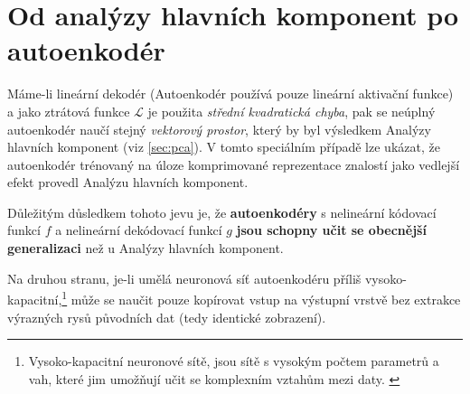 \section{Od analýzy hlavních komponent po autoenkodér}
Máme-li lineární dekodér (Autoenkodér používá pouze lineární aktivační funkce) a jako ztrátová funkce $\mathcal{L}$ je použita \emph{střední kvadratická chyba},
pak se neúplný autoenkodér naučí stejný \emph{vektorový prostor}, který by byl výsledkem Analýzy hlavních komponent (viz \autoref{sec:pca}).
V tomto speciálním případě lze ukázat, že autoenkodér trénovaný na úloze komprimované reprezentace znalostí jako vedlejší efekt provedl Analýzu hlavních komponent. \cite{Baldi1989, Kamyshanska2013}

Důležitým důsledkem tohoto jevu je, že \textbf{autoenkodéry} s nelineární kódovací funkcí $f$
a nelineární dekódovací funkcí $g$ \textbf{jsou schopny učit se obecnější generalizaci}
než u Analýzy hlavních komponent. \cite{Goodfellow2016}

Na druhou stranu, je-li umělá neuronová síť autoenkodéru příliš vysoko-kapacitní,\footnote{Vysoko-kapacitní neuronové sítě, jsou sítě s vysokým počtem parametrů a vah, které jim umožňují učit se komplexním vztahům mezi daty. \cite[Kapitola 5]{Goodfellow2016}}
může se naučit pouze kopírovat vstup na výstupní vrstvě bez extrakce výrazných rysů původních dat (tedy identické zobrazení).
